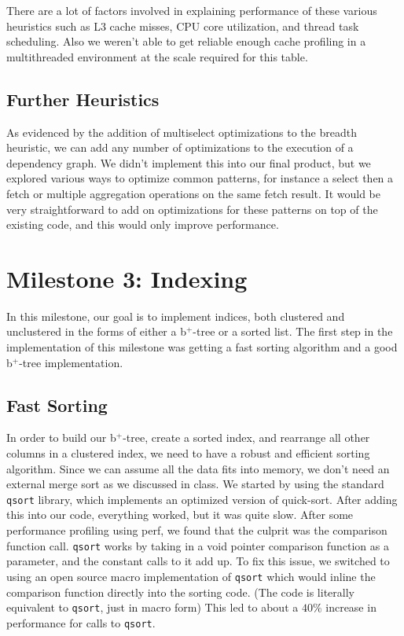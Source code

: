 \documentclass[a4paper, 12pt]{article}
\begin{document}
\medskip
There are a lot of factors involved in explaining performance of these various heuristics such as L3 cache misses, CPU core utilization, and thread task scheduling. Also we weren't able to get reliable enough cache profiling in a multithreaded environment at the scale required for this table.

\subsection{Further Heuristics}

As evidenced by the addition of multiselect optimizations to the breadth heuristic, we can add any number of optimizations to the execution of a dependency graph. We didn't implement this into our final product, but we explored various ways to optimize common patterns, for instance a select then a fetch or multiple aggregation operations on the same fetch result. It would be very straightforward to add on optimizations for these patterns on top of the existing code, and this would only improve performance.

\section{Milestone 3: Indexing}

In this milestone, our goal is to implement indices, both clustered and unclustered in the forms of either a b$^+$-tree or a sorted list. The first step in the implementation of this milestone was getting a fast sorting algorithm and a good b$^+$-tree implementation.

\subsection{Fast Sorting}
In order to build our b$^+$-tree, create a sorted index, and rearrange all other columns in a clustered index, we need to have a robust and efficient sorting algorithm. Since we can assume all the data fits into memory, we don't need an external merge sort as we discussed in class. We started by using the standard \texttt{qsort} library, which implements an optimized version of quick-sort. After adding this into our code, everything worked, but it was quite slow. After some performance profiling using perf, we found that the culprit was the comparison function call. \texttt{qsort} works by taking in a void pointer comparison function as a parameter, and the constant calls to it add up. To fix this issue, we switched to using an open source macro implementation of \texttt{qsort} which would inline the comparison function directly into the sorting code. (The code is literally equivalent to \texttt{qsort}, just in macro form) This led to about a $40\%$ increase in performance for calls to \texttt{qsort}.
\end{document}
